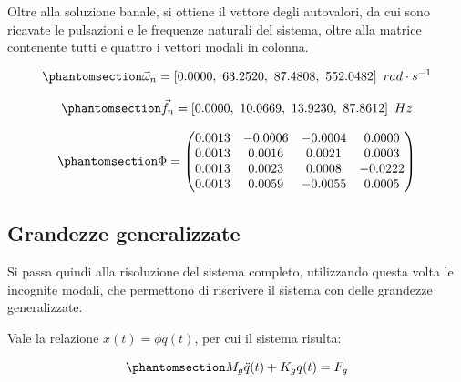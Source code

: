 \documentclass{article}
\begin{document}
        Oltre alla soluzione banale, si ottiene il vettore degli autovalori, da cui sono ricavate le pulsazioni e
        le frequenze naturali del sistema, oltre alla matrice contenente tutti e quattro i vettori modali in colonna.

        \begin{equation}
            \phantomsection \label{equation:puls_nat}
            \vec{\omega}_n  = \left[0.0000, \ 63.2520, \ 87.4808, \ 552.0482 \right] \ rad \cdot s^{-1} 
        \end{equation}

        \begin{equation}
            \phantomsection \label{equation:freq_nat}
            \vec{f}_n  = \left[0.0000, \ 10.0669, \ 13.9230, \ 87.8612 \right] \ Hz 
        \end{equation}

        \begin{equation}
            \phantomsection \label{equation:matrice_modale}
         \Phi = \begin{pmatrix}
                   0.0013   & -0.0006       & -0.0004             &  0.0000     \\ 
                   0.0013   & 0.0016        &  0.0021             &  0.0003     \\
                   0.0013   & 0.0023        &  0.0008             & -0.0222    \\
                   0.0013   & 0.0059        & -0.0055             &  0.0005
                \end{pmatrix} 
        \end{equation}

        \clearpage

        \subsection{Grandezze generalizzate\label{Esercitazione_2_grandezze_generalizzate}}

        Si passa quindi alla risoluzione del sistema completo, utilizzando questa volta 
        le incognite modali, che permettono di riscrivere il sistema con delle grandezze generalizzate.
        
        Vale la relazione $x(t) = \phi q(t)$, per cui il sistema risulta:

        \begin{equation}
            \phantomsection \label{equation:sistema_generalizzato}
            M_g \ddot{q}(t) + K_g q(t) = F_g
        \end{equation}
\end{document}
